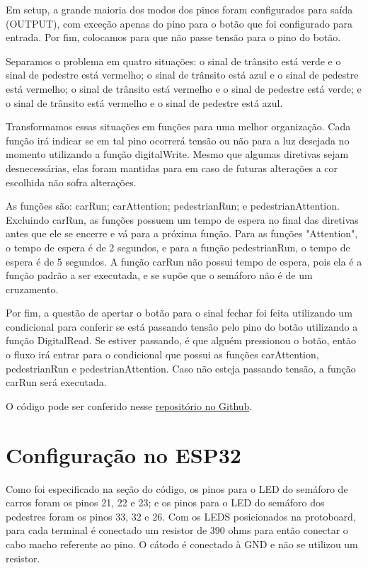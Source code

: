 \documentclass[12pt]{article}
\begin{document}
Em setup, a grande maioria dos modos dos pinos foram configurados para saída (OUTPUT), com exceção apenas do pino para o botão que foi configurado para entrada. Por fim, colocamos para que não passe tensão para o pino do botão.

Separamos o problema em quatro situações: o sinal de trânsito está verde e o sinal de pedestre está vermelho; o sinal de trânsito está azul e o sinal de pedestre está vermelho; o sinal de trânsito está vermelho e o sinal de pedestre está verde; e o sinal de trânsito está vermelho e o sinal de pedestre está azul.

Transformamos essas situações em funções para uma melhor organização. Cada função irá indicar se em tal pino ocorrerá tensão ou não para a luz desejada no momento utilizando a função digitalWrite. Mesmo que algumas diretivas sejam desnecessárias, elas foram mantidas para em caso de futuras alterações a cor escolhida não sofra alterações.

As funções são: carRun; carAttention; pedestrianRun; e pedestrianAttention. Excluindo carRun, as funções possuem um tempo de espera no final das diretivas antes que ele se encerre e vá para a próxima função. Para as funções "Attention", o tempo de espera é de 2 segundos, e para a função pedestrianRun, o tempo de espera é de 5 segundos. A função carRun não possui tempo de espera, pois ela é a função padrão a ser executada, e se supõe que o semáforo não é de um cruzamento.

Por fim, a questão de apertar o botão para o sinal fechar foi feita utilizando um condicional para conferir se está passando tensão pelo pino do botão utilizando a função DigitalRead. Se estiver passando, é que alguém pressionou o botão, então o fluxo irá entrar para o condicional que possui as funções carAttention, pedestrianRun e pedestrianAttention. Caso não esteja passando tensão, a função carRun será executada.

O código pode ser conferido nesse \href{https://github.com/fabricio-araujo94/microcontroladores/tree/main/semaforo}{repositório no Github}.

\section{Configuração no ESP32}\label{sec:configuração-no-esp32}

Como foi especificado na seção do código, os pinos para o LED do semáforo de carros foram os pinos 21, 22 e 23; e os pinos para o LED do semáforo dos pedestres foram os pinos 33, 32 e 26. Com os LEDS posicionados na protoboard, para cada terminal é conectado um resistor de 390 ohms para então conectar o cabo macho referente ao pino. O cátodo é conectado à GND e não se utilizou um resistor.
\end{document}
